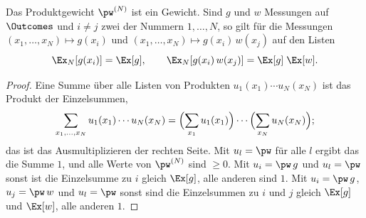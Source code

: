 \begin{vertiefung}
  \begin{lemma}[Produktgewicht]\label{c01.lem.produkt}
    Das Produktgewicht $\pw^{(N)}$ ist ein Gewicht. Sind $g$ und $w$ Messungen auf
    $\Outcomes$ und $i \neq j$ zwei der Nummern $1, \dots, N$, so gilt für die Messungen
    $(x_1, \dots, x_N) \mapsto g(x_i)$ und $(x_1, \dots, x_N) \mapsto g(x_i)\,w(x_j)$ auf
    den Listen
    \begin{equation}\label{c01.eq.produkt}
      \Ex_N[g(x_i)] = \Ex[g],
      \qquad
      \Ex_N[g(x_i)\,w(x_j)] = \Ex[g]\;\Ex[w] .
    \end{equation}
  \end{lemma}
  \begin{proof}
    Eine Summe über alle Listen von Produkten $u_1(x_1)\cdots u_N(x_N)$ ist das Produkt der
    Einzelsummen,
    \begin{equation*}
      \sum_{x_1, \dots, x_N} u_1(x_1)\cdots u_N(x_N)
      = \Bigl(\sum_{x_1} u_1(x_1)\Bigr)\cdots\Bigl(\sum_{x_N} u_N(x_N)\Bigr) ;
    \end{equation*}
    das ist das Ausmultiplizieren der rechten Seite. Mit $u_l = \pw$ für alle $l$ ergibt das die Summe
    $1$, und alle Werte von $\pw^{(N)}$ sind $\geq 0$. Mit $u_i = \pw\, g$ und $u_l = \pw$
    sonst ist die Einzelsumme zu $i$ gleich $\Ex[g]$, alle anderen sind $1$. Mit
    $u_i = \pw\, g$, $u_j = \pw\, w$ und $u_l = \pw$ sonst sind die Einzelsummen zu $i$ und
    $j$ gleich $\Ex[g]$ und $\Ex[w]$, alle anderen $1$.
  \end{proof}


\end{vertiefung}
